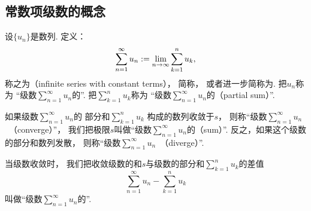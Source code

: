 \subsection{常数项级数的概念}
\begin{definition}\label{definition:无穷级数.常数项级数的定义}
设\(\{u_n\}\)是数列.
定义：\begin{equation*}
	\sum_{n=1}^\infty u_n
	:=
	\lim_{n\to\infty} \sum_{k=1}^n u_k,
\end{equation*}
称之为（infinite series with constant terms），
简称，
或者进一步简称为.
把\(u_n\)称为
“级数\(\sum_{n=1}^\infty u_n\)的”.
把\(\sum_{k=1}^n u_k\)称为
“级数\(\sum_{n=1}^\infty u_n\)的（partial sum）”.

如果级数\(\sum_{n=1}^\infty u_n\)的
部分和\(\sum_{k=1}^n u_k\)
构成的数列收敛于\(s\)，
则称“级数\(\sum_{n=1}^\infty u_n\)~（converge）”，
我们把极限\(s\)叫做“级数\(\sum_{n=1}^\infty u_n\)的（sum）”.
反之，如果这个级数的部分和数列发散，
则称“级数\(\sum_{n=1}^\infty u_n\)~（diverge）”.

当级数收敛时，
我们把收敛级数的和\(s\)与级数的部分和\(\sum_{k=1}^n u_k\)的差值\begin{equation*}
	\sum_{n=1}^\infty u_n - \sum_{k=1}^n u_k
\end{equation*}
叫做“级数\(\sum_{n=1}^\infty u_n\)的”.
\end{definition}

